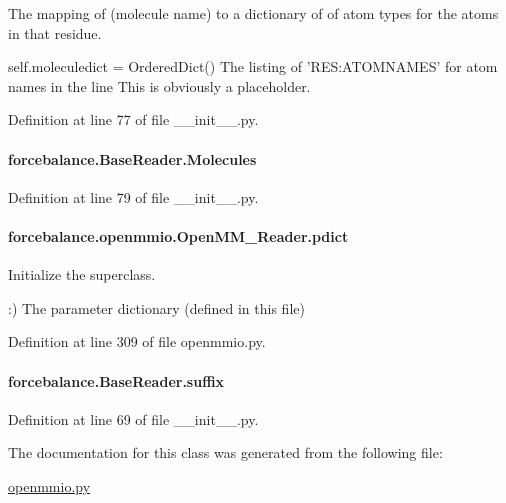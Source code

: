 The mapping of (molecule name) to a dictionary of of atom types for the atoms in that residue. 

self.\-moleculedict = Ordered\-Dict() The listing of 'R\-E\-S\-:A\-T\-O\-M\-N\-A\-M\-E\-S' for atom names in the line This is obviously a placeholder. 

Definition at line 77 of file \-\_\-\-\_\-init\-\_\-\-\_\-.\-py.

\hypertarget{classforcebalance_1_1BaseReader_a4369b5fb663a83b11602daa71db6862e}{
\paragraph[{Molecules}]{\setlength{\rightskip}{0pt plus 5cm}forcebalance.\-Base\-Reader.\-Molecules\hspace{0.3cm}{\ttfamily [inherited]}}}\label{classforcebalance_1_1BaseReader_a4369b5fb663a83b11602daa71db6862e}


Definition at line 79 of file \-\_\-\-\_\-init\-\_\-\-\_\-.\-py.

\hypertarget{classforcebalance_1_1openmmio_1_1OpenMM__Reader_a4fa2da992c7f0f525dcc465ffba69b86}{
\paragraph[{pdict}]{\setlength{\rightskip}{0pt plus 5cm}forcebalance.\-openmmio.\-Open\-M\-M\-\_\-\-Reader.\-pdict}}\label{classforcebalance_1_1openmmio_1_1OpenMM__Reader_a4fa2da992c7f0f525dcc465ffba69b86}


Initialize the superclass. 

\-:) The parameter dictionary (defined in this file) 

Definition at line 309 of file openmmio.\-py.

\hypertarget{classforcebalance_1_1BaseReader_a48ef0584a1b6b4b6f8eb741ad8465db8}{
\paragraph[{suffix}]{\setlength{\rightskip}{0pt plus 5cm}forcebalance.\-Base\-Reader.\-suffix\hspace{0.3cm}{\ttfamily [inherited]}}}\label{classforcebalance_1_1BaseReader_a48ef0584a1b6b4b6f8eb741ad8465db8}


Definition at line 69 of file \-\_\-\-\_\-init\-\_\-\-\_\-.\-py.



The documentation for this class was generated from the following file\-:\begin{DoxyCompactItemize}
\item 
\hyperlink{openmmio_8py}{openmmio.\-py}\end{DoxyCompactItemize}

